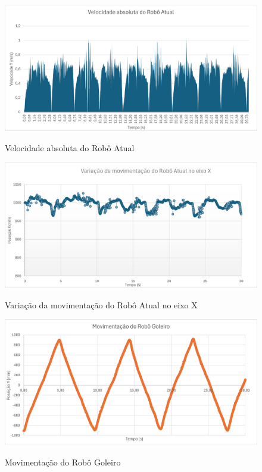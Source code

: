 \documentclass[deposito, acronym, symbols]{fei}
\begin{document}
\begin{figure}[!htb]
    \centering
    \caption{Velocidade absoluta do Robô Atual}
    \includegraphics[scale=0.6]{Imagens/Resultados finais/Velocidade absoluta do Robô atual.png}
    \label{fig:veloatual}
\end{figure}

\begin{figure}[!htb]
    \centering
    \caption{Variação da movimentação do Robô Atual no eixo X 
}
    \includegraphics[scale=0.6]{Imagens/Resultados finais/Variação do Robô atual.png}
    \label{fig:variaçãoatual}
\end{figure}

\begin{figure}[!htb]
    \centering
    \caption{Movimentação do Robô Goleiro}
    \includegraphics[scale=0.6]{Imagens/Resultados finais/Movimentação do Robô Goleiro.png}
    \label{fig:movigoleiro}
\end{figure}
\end{document}
